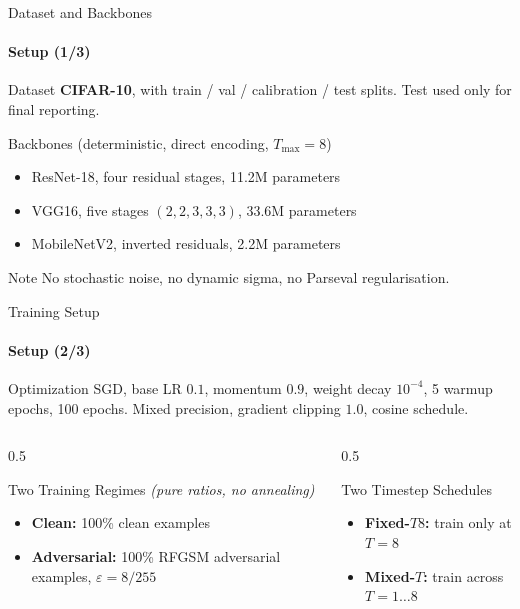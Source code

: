 \documentclass[aspectratio=169,11pt]{beamer}
\begin{document}
\begin{frame}{Dataset and Backbones}\framesubtitle{Setup (1/3)}
\begin{block}{Dataset}
\textbf{CIFAR-10}, with train / val / calibration / test splits. Test used only for final reporting.
\end{block}
\vspace{0.3em}
\begin{block}{Backbones (deterministic, direct encoding, $T_{\max}=8$)}
\begin{itemize}\small
  \item ResNet-18, four residual stages, 11.2M parameters
  \item VGG16, five stages $(2,2,3,3,3)$, 33.6M parameters
  \item MobileNetV2, inverted residuals, 2.2M parameters
\end{itemize}
\end{block}
\vspace{0.3em}
\begin{alertblock}{Note}
\small No stochastic noise, no dynamic sigma, no Parseval regularisation.
\end{alertblock}
\end{frame}

\begin{frame}{Training Setup}\framesubtitle{Setup (2/3)}
\begin{block}{Optimization}
\small SGD, base LR $0.1$, momentum $0.9$, weight decay $10^{-4}$, 5 warmup epochs, 100 epochs.
Mixed precision, gradient clipping $1.0$, cosine schedule.
\end{block}
\vspace{0.4em}
\begin{columns}[T]
\begin{column}{0.5\textwidth}
\begin{block}{Two Training Regimes}
\small\textit{(pure ratios, no annealing)}
\begin{itemize}\small
  \item \textbf{Clean:} 100\% clean examples
  \item \textbf{Adversarial:} 100\% RFGSM adversarial examples, $\varepsilon = 8/255$
\end{itemize}
\end{block}
\end{column}
\begin{column}{0.5\textwidth}
\begin{block}{Two Timestep Schedules}
\begin{itemize}\small
  \item \textbf{Fixed-$T8$:} train only at $T=8$
  \item \textbf{Mixed-$T$:} train across $T=1 \ldots 8$
\end{itemize}
\end{block}
\end{column}
\end{columns}
\end{frame}
\end{document}
